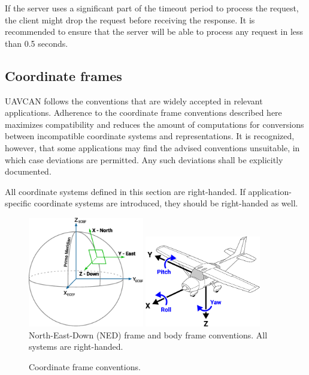 If the server uses a significant part of the timeout period to process the request,
the client might drop the request before receiving the response.
It is recommended to ensure that the server will be able to process any request in less than 0.5 seconds.

\subsection{Coordinate frames}

UAVCAN follows the conventions that are widely accepted in relevant applications.
Adherence to the coordinate frame conventions described here maximizes compatibility and
reduces the amount of computations for conversions between incompatible coordinate systems and
representations.
It is recognized, however, that some applications may find the advised conventions unsuitable,
in which case deviations are permitted.
Any such deviations shall be explicitly documented.

All coordinate systems defined in this section are right-handed.
If application-specific coordinate systems are introduced, they should be right-handed as well.

\begin{figure}[hbt]
    \centering
	\includegraphics[width=0.45\textwidth]{application_layer/NED_ECEF}
    \includegraphics[width=0.45\textwidth]{application_layer/aircraft_principal_axes}
    North-East-Down (NED) frame and body frame conventions. All systems are right-handed.
    \caption{
        Coordinate frame conventions.
        \label{fig:application_coordinate_frame_conventions}
    }
\end{figure}

